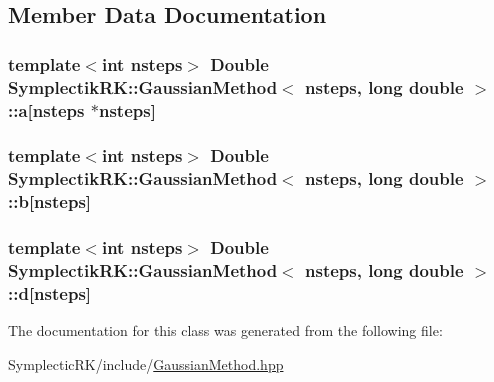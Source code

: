 \subsection{Member Data Documentation}
\hypertarget{classSymplectikRK_1_1GaussianMethod_3_01nsteps_00_01long_01double_01_4_ad0139c8e401d01a4567bdfd87a704e4f}{
\subsubsection[{a}]{\setlength{\rightskip}{0pt plus 5cm}template$<$int nsteps$>$ {\bf Double} {\bf Symplectik\-R\-K\-::\-Gaussian\-Method}$<$ nsteps, long double $>$\-::a\mbox{[}nsteps $\ast$nsteps\mbox{]}\hspace{0.3cm}{\ttfamily [protected]}}}\label{classSymplectikRK_1_1GaussianMethod_3_01nsteps_00_01long_01double_01_4_ad0139c8e401d01a4567bdfd87a704e4f}
\hypertarget{classSymplectikRK_1_1GaussianMethod_3_01nsteps_00_01long_01double_01_4_a48e2da4387971199a4e29708014af888}{
\subsubsection[{b}]{\setlength{\rightskip}{0pt plus 5cm}template$<$int nsteps$>$ {\bf Double} {\bf Symplectik\-R\-K\-::\-Gaussian\-Method}$<$ nsteps, long double $>$\-::b\mbox{[}nsteps\mbox{]}\hspace{0.3cm}{\ttfamily [protected]}}}\label{classSymplectikRK_1_1GaussianMethod_3_01nsteps_00_01long_01double_01_4_a48e2da4387971199a4e29708014af888}
\hypertarget{classSymplectikRK_1_1GaussianMethod_3_01nsteps_00_01long_01double_01_4_a557dd00c45d89ad23ea81416711665d7}{
\subsubsection[{d}]{\setlength{\rightskip}{0pt plus 5cm}template$<$int nsteps$>$ {\bf Double} {\bf Symplectik\-R\-K\-::\-Gaussian\-Method}$<$ nsteps, long double $>$\-::d\mbox{[}nsteps\mbox{]}\hspace{0.3cm}{\ttfamily [protected]}}}\label{classSymplectikRK_1_1GaussianMethod_3_01nsteps_00_01long_01double_01_4_a557dd00c45d89ad23ea81416711665d7}


The documentation for this class was generated from the following file\-:\begin{DoxyCompactItemize}
\item 
Symplectic\-R\-K/include/\hyperlink{GaussianMethod_8hpp}{Gaussian\-Method.\-hpp}\end{DoxyCompactItemize}
